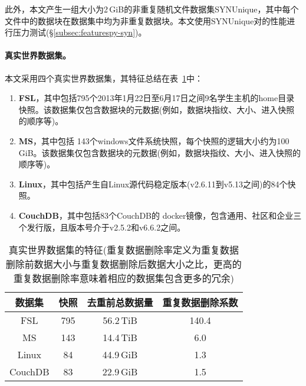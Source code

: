 此外，本文产生一组大小为2\,GiB的非重复随机文件数据集SYNUnique，其中每个文件中的数据块在数据集中均为非重复数据块。本文使用SYNUnique对\prototype 的性能进行压力测试(\S\ref{subsec:featurespy-syn})。

\paragraph*{真实世界数据集。}本文采用四个真实世界数据集，其特征总结在表~\ref{tab:featurespy-datasets}中： 

\begin{enumerate}
    \item \textbf{FSL}\cite{fsl}，其中包括795个2013年1月22日至6月17日之间9名学生主机的home目录快照。该数据集仅包含数据块的元数据(例如，数据块指纹、大小、进入快照的顺序等)。
    \item \textbf{MS}\cite{meyer2011deduplication}，其中包括 143个windows文件系统快照，每个快照的逻辑大小约为100\,GiB。该数据集仅包含数据块的元数据(例如，数据块指纹、大小、进入快照的顺序等)。
    \item \textbf{Linux}\cite{linux}，其中包括产生自Linux源代码稳定版本(v2.6.11到v5.13之间)的84个快照。
    \item \textbf{CouchDB}\cite{couchdb}，其中包括83个CouchDB的 docker镜像，包含通用、社区和企业三个发行版，且版本号介于v2.5.2和v6.6.2之间。
\end{enumerate}

\begin{table}
  \centering
  \small
  \begin{tabular}{cccc}
    \toprule
    {\bf 数据集} & {\bf 快照} & {\bf 去重前总数据量} & {\bf 重复数据删除系数} \\
    \midrule
    FSL & 795 & 56.2\,TiB & 140.4 \\
    MS & 143 & 14.4\,TiB & 6.0 \\
    Linux & 84 & 44.9\,GiB & 1.3 \\
    CouchDB & 83 & 22.9\,GiB & 1.5 \\
    \bottomrule
  \end{tabular}
  \caption{真实世界数据集的特征(重复数据删除率定义为重复数据删除前数据大小与重复数据删除后数据大小之比，更高的重复数据删除率意味着相应的数据集包含更多的冗余)}
  \label{tab:featurespy-datasets}
\end{table}
